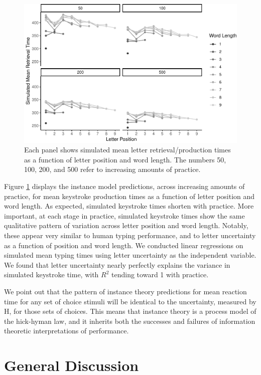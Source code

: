 \documentclass[floatsintext,man]{apa6}
\theoremstyle{definition}
\theoremstyle{definition}
\theoremstyle{definition}
\theoremstyle{remark}
\begin{document}
\begin{figure}[htbp]
\centering
\includegraphics{Entropy_typing_draft_files/figure-latex/instance-model-1.pdf}
\caption{\label{fig:instance-model}Each panel shows simulated mean letter
retrieval/production times as a function of letter position and word
length. The numbers 50, 100, 200, and 500 refer to increasing amounts of
practice.}
\end{figure}

Figure \ref{fig:instance-model} displays the instance model predictions,
across increasing amounts of practice, for mean keystroke production
times as a function of letter position and word length. As expected,
simulated keystroke times shorten with practice. More important, at each
stage in practice, simulated keystroke times show the same qualitative
pattern of variation across letter position and word length. Notably,
these appear very similar to human typing performance, and to letter
uncertainty as a function of position and word length. We conducted
linear regressions on simulated mean typing times using letter
uncertainty as the independent variable. We found that letter
uncertainty nearly perfectly explains the variance in simulated
keystroke time, with \(R^2\) tending toward 1 with practice.

We point out that the pattern of instance theory predictions for mean
reaction time for any set of choice stimuli will be identical to the
uncertainty, measured by H, for those sets of choices. This means that
instance theory is a process model of the hick-hyman law, and it
inherits both the successes and failures of information theoretic
interpretations of performance.

\section{General Discussion}\label{general-discussion}
\end{document}
